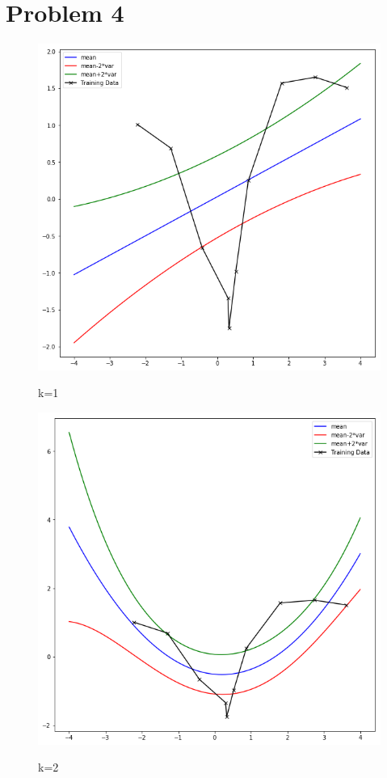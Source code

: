 \documentclass{article}
\begin{document}
\section*{Problem 4}
\begin{figure}[h!]
\begin{center}
\includegraphics[scale=0.5]{one.png}
\label{one}
\caption{k=1}
\end{center}
\end{figure}

\begin{figure}[h!]
\begin{center}
\includegraphics[scale=0.5]{two.png}
\label{two}
\caption{k=2}
\end{center}
\end{figure}
\end{document}
